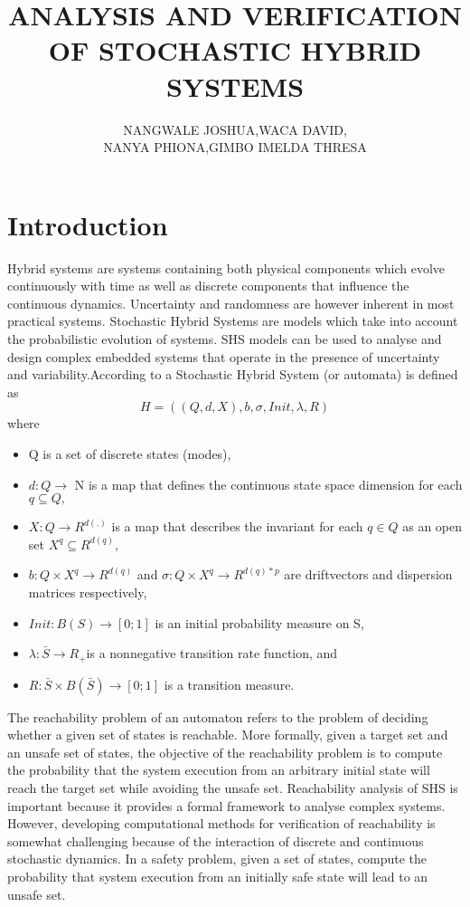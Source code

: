 \documentclass{article}
\begin{document}
\title{ANALYSIS AND VERIFICATION OF STOCHASTIC HYBRID SYSTEMS}
\author{NANGWALE JOSHUA,WACA DAVID,\\ NANYA PHIONA,GIMBO IMELDA THRESA}
\maketitle

\section{Introduction}
Hybrid systems are systems containing both physical components which evolve continuously with time as well as discrete components that influence the continuous dynamics. Uncertainty and randomness are however inherent in most practical systems.  Stochastic Hybrid Systems are models which take into account the probabilistic evolution of systems. SHS models can be used to analyse and design complex embedded systems that operate in the presence of uncertainty and variability.According to \cite{SHS1} a Stochastic Hybrid System (or automata) is defined as $$ H=((Q,d,X),b,\sigma,Init,\lambda,R)$$  where
\begin{itemize}
\item Q is a set of discrete states (modes),
\item $d : Q \rightarrow$ N is a map that defines the continuous state space dimension for each $q \subseteq Q,$
\item $X : Q \rightarrow R^{d(.)}$ is a map that describes the invariant for each $ q \in Q$ as an open set $X^q \subseteq R^{d(q)},$
 \item $b : Q \times X^q \rightarrow R^{d(q)}$ and $ \sigma : Q \times X^q \rightarrow R^{d(q)*p}$ are driftvectors and dispersion matrices respectively,
\item $ Init : B(S) \rightarrow [0; 1]$ is an initial probability measure on S,
\item $\lambda : \bar{S} \rightarrow R_{+} $is a nonnegative transition rate function, and
\item $ R : \bar{S} \times B(\bar{S}) \rightarrow [0; 1]$ is a transition measure.
\end{itemize}
The reachability problem of an automaton refers to the problem of deciding whether a given set of states is reachable. More formally, given a target set and an unsafe set of states, the objective  of the reachability problem is to compute the probability that the system execution from an arbitrary initial state will reach the target set while avoiding the unsafe set. Reachability analysis of SHS is important because it provides a formal framework to analyse complex systems. However, developing computational methods for verification of reachability is somewhat challenging because of the interaction of discrete and continuous stochastic dynamics.
In a safety problem, given a set of states, compute the probability that system execution from an initially safe state will lead to an unsafe set.
\end{document}
